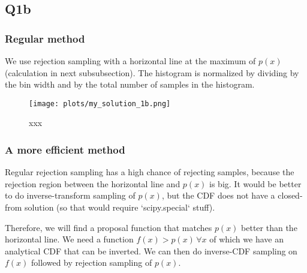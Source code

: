 \subsection{Q1b}

\subsubsection{Regular method}

We use rejection sampling with a horizontal line at the maximum of $p(x)$ (calculation in next subsubsection).
The histogram is normalized by dividing by the bin width and by the total number of samples in the histogram.

\begin{figure}[H]
    \centering
    \texttt{[image: plots/my\_solution\_1b.png]}
    \caption{xxx
    } \label{fig:1b}
\end{figure}


\subsubsection{A more efficient method}
Regular rejection sampling has a high chance of rejecting samples, because the rejection region between the
horizontal line and $p(x)$ is big. It would be better to do inverse-transform sampling of $p(x)$, but the
CDF does not have a closed-from solution (so that would require `scipy.special` stuff).

Therefore, we will find a proposal function that matches $p(x)$ better than the horizontal line. We need
a function $f(x) > p(x) \, \forall x$ of which we have an analytical CDF that 
can be inverted. We can then do inverse-CDF sampling on $f(x)$ followed by rejection sampling of $p(x)$.

